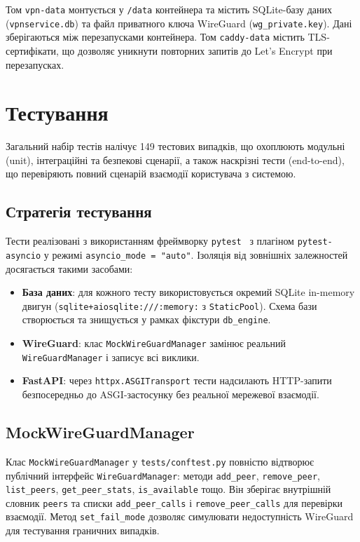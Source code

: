 Том \texttt{vpn-data} монтується у \texttt{/data} контейнера та містить
SQLite-базу даних (\texttt{vpnservice.db}) та файл приватного ключа
WireGuard (\texttt{wg\_private.key}). Дані зберігаються між
перезапусками контейнера. Том \texttt{caddy-data} містить TLS-сертифікати,
що дозволяє уникнути повторних запитів до Let's Encrypt при перезапусках.

\section{Тестування}
\label{sec:testing}

Загальний набір тестів налічує 149 тестових випадків, що охоплюють
модульні (unit), інтеграційні та безпекові сценарії, а також наскрізні
тести (end-to-end), що перевіряють повний сценарій взаємодії користувача
з системою.

\subsection{Стратегія тестування}

Тести реалізовані з використанням фреймворку \texttt{pytest}~\cite{pytest2024}
з плагіном \texttt{pytest-asyncio} у режимі \texttt{asyncio\_mode = "auto"}.
Ізоляція від зовнішніх залежностей досягається такими засобами:
\begin{itemize}
  \item \textbf{База даних}: для кожного тесту використовується окремий
        SQLite in-memory двигун (\texttt{sqlite+aiosqlite:///:memory:} з
        \texttt{StaticPool}). Схема бази створюється та знищується у
        рамках фікстури \texttt{db\_engine}.
  \item \textbf{WireGuard}: клас \texttt{MockWireGuardManager} замінює
        реальний \texttt{WireGuardManager} і записує всі виклики.
  \item \textbf{FastAPI}: через \texttt{httpx.ASGITransport} тести
        надсилають HTTP-запити безпосередньо до ASGI-застосунку без
        реальної мережевої взаємодії.
\end{itemize}

\subsection{MockWireGuardManager}

Клас \texttt{MockWireGuardManager} у \texttt{tests/conftest.py} повністю
відтворює публічний інтерфейс \texttt{WireGuardManager}: методи
\texttt{add\_peer}, \texttt{remove\_peer}, \texttt{list\_peers},
\texttt{get\_peer\_stats}, \texttt{is\_available} тощо. Він зберігає
внутрішній словник \texttt{peers} та списки \texttt{add\_peer\_calls} і
\texttt{remove\_peer\_calls} для перевірки взаємодії.
Метод \texttt{set\_fail\_mode} дозволяє симулювати недоступність
WireGuard для тестування граничних випадків.

